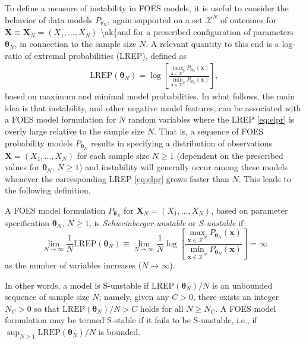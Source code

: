 \documentclass[numbib]{imamat}
\theoremstyle{theorem}
\theoremstyle{lemma}
\theoremstyle{example}
\theoremstyle{corollary}
\theoremstyle{definition}
\theoremstyle{remark}
\theoremstyle{approximation}
\theoremstyle{scheme}
\newcommand{\REP}{\mathrm{LREP}}
\newcommand{\ak}[1]{{\color{blue} #1}}
\let\BeginKnitrBlock\begin \let\EndKnitrBlock\end
\begin{document}
To define a measure of instability in FOES models, it is useful to consider the behavior of data models \(P_{\theta_N}\), again supported on a set \(\mathcal{X}^N\) of outcomes for \(\boldsymbol X\equiv \boldsymbol X_N =(X_1,\ldots,X_N)\) \textbackslash ak\{and for a prescribed configuration of parameters \(\boldsymbol \theta_N\), in connection to the sample size \(N\). A relevant quantity to this end is a log-ratio of extremal probabilities (LREP), defined as
\begin{align}
\label{eq:elpr}
 \REP (\boldsymbol \theta_N)  =  \log \left[\frac{\max\limits_{  \boldsymbol x\in \mathcal{X}^N}P_{\boldsymbol \theta_N}( \boldsymbol x)}{\min\limits_{ \boldsymbol x \in \mathcal{X}^N}P_{\boldsymbol \theta_N}( \boldsymbol x)}\right],
\end{align}
based on maximum and minimal model probabilities. In what follows, the main idea is that instability, and other negative model features, can be associated with a FOES model formulation for \(N\) random variables where the LREP \eqref{eq:elpr} is overly large relative to the sample size \(N\). That is, a sequence of FOES probability models \(P_{\boldsymbol \theta_N}\) results in specifying \ak{a} distribution of observations \(\boldsymbol X=(X_1,\ldots,X_N)\) for each sample size \(N \geq 1\) \ak{(dependent on the prescribed values for $\boldsymbol \theta_N$, $N \geq 1$)} and instability will generally occur among these models whenever the corresponding LREP \eqref{eq:elpr} grows faster than \(N\). This leads to the following definition.

\BeginKnitrBlock{definition}[S-unstable FOES model]
\protect\hypertarget{def:instabFSFS}{}{\label{def:instabFSFS} \iffalse (S-unstable FOES model) \fi{} }A FOES model formulation \ak{$P_{\boldsymbol \theta_N}$} for \(\boldsymbol X_N=(X_1,\ldots,X_N)\), \ak{based on parameter specification $\boldsymbol \theta_N$, $N \geq 1$,} is \emph{Schweinberger-unstable} or \emph{S-unstable} if
\begin{equation}
\label{eq:Sun}
\lim \limits_{N \rightarrow \infty} \frac{1}{N} \REP(\boldsymbol \theta_N) \equiv \lim \limits_{N \rightarrow \infty} \frac{1}{N}\log \left[\frac{\max\limits_{  \boldsymbol x\in \mathcal{X}^N}P_{\boldsymbol \theta_N}( \boldsymbol x)}{\min\limits_{ \boldsymbol x \in \mathcal{X}^N}P_{\boldsymbol \theta_N}( \boldsymbol x)}\right] = \infty
\end{equation}
as the number of variables increases (\(N \rightarrow \infty\)).
\EndKnitrBlock{definition}

In other words, a model is S-unstable if \(\REP(\boldsymbol \theta_N)/N\) is an unbounded sequence of sample size \(N\); namely, given any \(C > 0\), there exists an integer \(N_C > 0\) so that \(\REP(\boldsymbol \theta_N)/N > C\) holds for all \(N \ge N_C\). A FOES model formulation may be termed S-stable if it fails to be S-unstable, i.e., if \(\sup_{N \geq 1}\REP(\boldsymbol \theta_N)/N\) is bounded.
\end{document}
